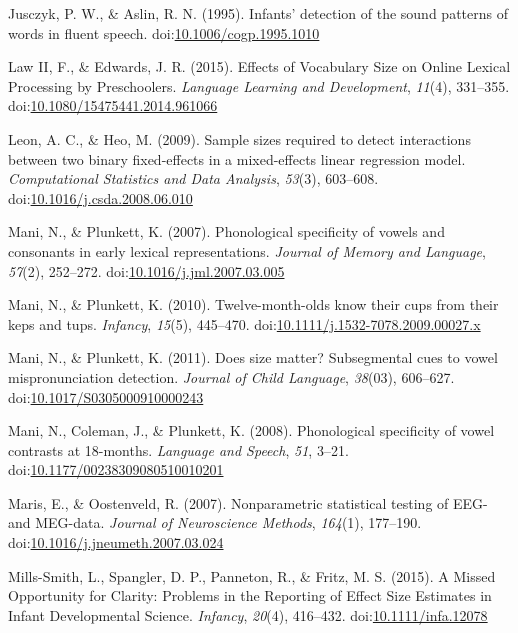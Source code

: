 \documentclass[man]{apa6}
\theoremstyle{definition}
\theoremstyle{definition}
\theoremstyle{definition}
\theoremstyle{remark}
\begin{document}
\hypertarget{ref-Jusczyk1995}{}
Jusczyk, P. W., \& Aslin, R. N. (1995). Infants' detection of the sound
patterns of words in fluent speech.
doi:\href{https://doi.org/10.1006/cogp.1995.1010}{10.1006/cogp.1995.1010}

\hypertarget{ref-Law2015}{}
Law II, F., \& Edwards, J. R. (2015). Effects of Vocabulary Size on
Online Lexical Processing by Preschoolers. \emph{Language Learning and
Development}, \emph{11}(4), 331--355.
doi:\href{https://doi.org/10.1080/15475441.2014.961066}{10.1080/15475441.2014.961066}

\hypertarget{ref-Leon2009}{}
Leon, A. C., \& Heo, M. (2009). Sample sizes required to detect
interactions between two binary fixed-effects in a mixed-effects linear
regression model. \emph{Computational Statistics and Data Analysis},
\emph{53}(3), 603--608.
doi:\href{https://doi.org/10.1016/j.csda.2008.06.010}{10.1016/j.csda.2008.06.010}

\hypertarget{ref-Mani2007}{}
Mani, N., \& Plunkett, K. (2007). Phonological specificity of vowels and
consonants in early lexical representations. \emph{Journal of Memory and
Language}, \emph{57}(2), 252--272.
doi:\href{https://doi.org/10.1016/j.jml.2007.03.005}{10.1016/j.jml.2007.03.005}

\hypertarget{ref-Mani2010kepstups}{}
Mani, N., \& Plunkett, K. (2010). Twelve-month-olds know their cups from
their keps and tups. \emph{Infancy}, \emph{15}(5), 445--470.
doi:\href{https://doi.org/10.1111/j.1532-7078.2009.00027.x}{10.1111/j.1532-7078.2009.00027.x}

\hypertarget{ref-Mani2011}{}
Mani, N., \& Plunkett, K. (2011). Does size matter? Subsegmental cues to
vowel mispronunciation detection. \emph{Journal of Child Language},
\emph{38}(03), 606--627.
doi:\href{https://doi.org/10.1017/S0305000910000243}{10.1017/S0305000910000243}

\hypertarget{ref-Mani2008}{}
Mani, N., Coleman, J., \& Plunkett, K. (2008). Phonological specificity
of vowel contrasts at 18-months. \emph{Language and Speech}, \emph{51},
3--21.
doi:\href{https://doi.org/10.1177/00238309080510010201}{10.1177/00238309080510010201}

\hypertarget{ref-Maris2007}{}
Maris, E., \& Oostenveld, R. (2007). Nonparametric statistical testing
of EEG- and MEG-data. \emph{Journal of Neuroscience Methods},
\emph{164}(1), 177--190.
doi:\href{https://doi.org/10.1016/j.jneumeth.2007.03.024}{10.1016/j.jneumeth.2007.03.024}

\hypertarget{ref-Mills-Smith2015}{}
Mills-Smith, L., Spangler, D. P., Panneton, R., \& Fritz, M. S. (2015).
A Missed Opportunity for Clarity: Problems in the Reporting of Effect
Size Estimates in Infant Developmental Science. \emph{Infancy},
\emph{20}(4), 416--432.
doi:\href{https://doi.org/10.1111/infa.12078}{10.1111/infa.12078}
\end{document}
